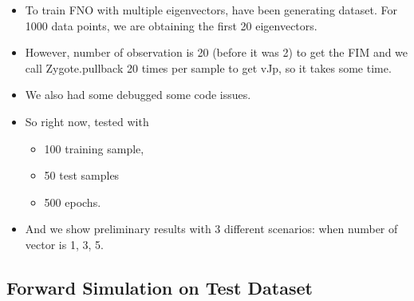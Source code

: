 \documentclass[
]{article}
\providecommand{\tightlist}{%
  \setlength{\itemsep}{0pt}\setlength{\parskip}{0pt}}\usepackage{longtable,booktabs,array}
\begin{document}
\begin{itemize}
\tightlist
\item
  To train FNO with multiple eigenvectors, have been generating dataset.
  For 1000 data points, we are obtaining the first 20 eigenvectors.
\item
  However, number of observation is 20 (before it was 2) to get the FIM
  and we call Zygote.pullback 20 times per sample to get vJp, so it
  takes some time.
\item
  We also had some debugged some code issues.
\item
  So right now, tested with

  \begin{itemize}
  \tightlist
  \item
    100 training sample,
  \item
    50 test samples
  \item
    500 epochs.
  \end{itemize}
\item
  And we show preliminary results with 3 different scenarios: when
  number of vector is 1, 3, 5.
\end{itemize}

\subsection{Forward Simulation on Test
Dataset}\label{forward-simulation-on-test-dataset-1}
\end{document}

